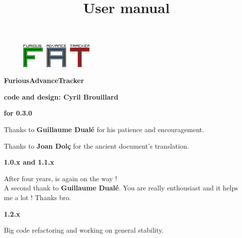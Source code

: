 \documentclass[12pt,a4paper]{article}
\title{\bf \SimpleImage{images/furicat_color}{0.3} \\ User manual}
\author{\fatversion}
\begin{document}
  \begin{figure}
    \begin{center}
    \includegraphics[scale=2]{images/logo}
    \end{center}
  \end{figure}
  \maketitle{}
  \thispagestyle{empty}
  \setcounter{page}{0}
  \ClearShipoutPicture

  \newpage

  \begin{center}

  {\bf \FAT FuriousAdvanceTracker} \medskip

  {\bf code and design: Cyril Brouillard} \medskip

  {\bf for 0.3.0} \medskip

  Thanks to {\bf \textcolor{vert}{Guillaume Dualé}} for his patience and encouragement.\medskip

  Thanks to {\bf \textcolor{vert}{Joan Dolç}} for the ancient document's translation. \medskip

  {\bf 1.0.x and 1.1.x} \medskip

  After four years, \FAT is again on the way ! \\
  A second thank to {\bf \textcolor{vert}{Guillaume Dualé}}. You are really enthousiast and it helps me a lot ! Thanks bro.

  {\bf 1.2.x} \medskip

  Big code refactoring and working on general stability.


  \end{center}

  \thispagestyle{empty}
  \setcounter{page}{0}
  \ClearShipoutPicture
  \newpage

  \tableofcontents{}
  \newpage
\end{document}
